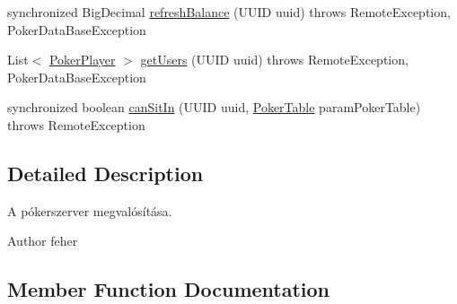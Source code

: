 \begin{DoxyCompactItemize}
synchronized Big\+Decimal \hyperlink{classhu_1_1elte_1_1bfw1p6_1_1poker_1_1server_1_1_poker_remote_impl_a74fcc0cbb63deaef8445b0af16d1338e}{refresh\+Balance} (U\+U\+I\+D uuid)  throws Remote\+Exception, Poker\+Data\+Base\+Exception 
\item 
List$<$ \hyperlink{classhu_1_1elte_1_1bfw1p6_1_1poker_1_1model_1_1entity_1_1_poker_player}{Poker\+Player} $>$ \hyperlink{classhu_1_1elte_1_1bfw1p6_1_1poker_1_1server_1_1_poker_remote_impl_a7e535566de2ee489ef49d8f10e2f245a}{get\+Users} (U\+U\+I\+D uuid)  throws Remote\+Exception, Poker\+Data\+Base\+Exception 
\item 
synchronized boolean \hyperlink{classhu_1_1elte_1_1bfw1p6_1_1poker_1_1server_1_1_poker_remote_impl_a7666636085ced9f3b5bbd13d0cc3a4ac}{can\+Sit\+In} (U\+U\+I\+D uuid, \hyperlink{classhu_1_1elte_1_1bfw1p6_1_1poker_1_1model_1_1entity_1_1_poker_table}{Poker\+Table} param\+Poker\+Table)  throws Remote\+Exception 
\end{DoxyCompactItemize}


\subsection{Detailed Description}
A pókerszerver megvalósítása. \begin{DoxyAuthor}{Author}
feher 
\end{DoxyAuthor}


\subsection{Member Function Documentation}
\hypertarget{classhu_1_1elte_1_1bfw1p6_1_1poker_1_1server_1_1_poker_remote_impl_a7666636085ced9f3b5bbd13d0cc3a4ac}{}
